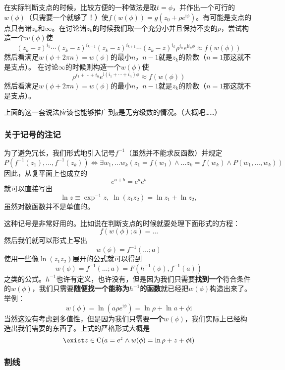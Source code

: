 在实际判断支点的时候，比较方便的一种做法是取$t=\phi$，并作出一个可行的$w(\phi)$（只需要一个就够了！）使$f(w(\phi))=g(z_0 + \rho e^{\mathrm{i}\phi})$。有可能是支点的点只有诸$z_k$和$\infty$。在讨论诸$z_k$的时候我们取一个充分小并且保持不变的$\rho$，尝试构造一个$w(\phi)$使
\[
(z_k - z)^{i_1} \cdots (z_k - z)^{i_{k-1}} (z_k - z)^{i_{k+1}} \cdots (z_k - z)^{i_k} \rho^{i_k} e^{\mathrm{i}i_k \phi} \approx f(w(\phi))
\]
然后看满足$w(\phi+2\pi n) = w(\phi)$的最小$n$，$n-1$就是$z_k$的阶数（$n=1$那这就不是支点）。
在讨论$\infty$的时候则构造一个$w(\phi)$使 \[
\rho^{i_1 + \cdots + i_n} e^{\mathrm{i}(i_1 + \cdots + i_n)\phi} \approx f(w(\phi))
\]
然后看满足$w(\phi+2\pi n) = w(\phi)$的最小$n$，$n-1$就是$z_k$的阶数（$n=1$那这就不是支点）。

上面的这一套说法应该也能够推广到$g$是无穷级数的情况。（大概吧\ldots{}\ldots{}）

\hypertarget{ux5173ux4e8eux8bb0ux53f7ux7684ux6ce8ux8bb0}{%
\subsubsection{关于记号的注记}\label{ux5173ux4e8eux8bb0ux53f7ux7684ux6ce8ux8bb0}}

为了避免冗长，我们形式地引入记号$f^{-1}$（虽然并不能求反函数）并规定
\[
P(f^{-1}(z_1), \ldots, f^{-1}(z_k)) \Leftrightarrow \exists w_1, \ldots w_k (z_1 = f(w_1) \land \ldots z_k = f(w_k) \land P(w_1, \ldots, w_k))
\] 因此，从复平面上也成立的 \[
e^{a+b} = e^a e^b
\] 就可以直接写出 \[
\ln z \equiv \exp^{-1} z, \; \ln (z_1 z_2) = \ln z_1 + \ln z_2,
\] 虽然对数函数并不是单值的。

这种记号是非常好用的。比如说在判断支点的时候就要处理下面形式的方程： \[
f(w(\phi);a) = \ldots
\] 然后我们就可以形式上写出 \[
w(\phi) = f^{-1}(\ldots;a) 
\] 使用一些像$\ln(z_1z_2)$展开的公式就可以得到 \[
w(\phi) = f^{-1}(\ldots;a) = F(h^{-1}(\phi), f^{-1}(a))
\]
之类的公式。$h^{-1}$也许有定义，也许没有，但是因为我们只需要\textbf{找到一个}符合条件的$w(\phi)$，我们只需要\textbf{随便找一个能称为$h^{-1}$的函数}就已经把$w(\phi)$构造出来了。举例：
\[
w(\phi) = \ln (a\rho e^{\mathrm{i}\phi}) = \ln \rho + \ln a + \phi \mathrm{i}
\]
当然这没有考虑到多值性，但是因为我们只需要\textbf{一个}$w(\phi)$，我们实际上已经构造出我们需要的东西了。上式的严格形式大概是
\[
\exist z \in \mathrm{C} (a = e^z \land w(\phi) = \ln \rho + z + \phi \mathrm{i})
\]

\hypertarget{ux5272ux7ebf}{%
\subsubsection{割线}\label{ux5272ux7ebf}}

